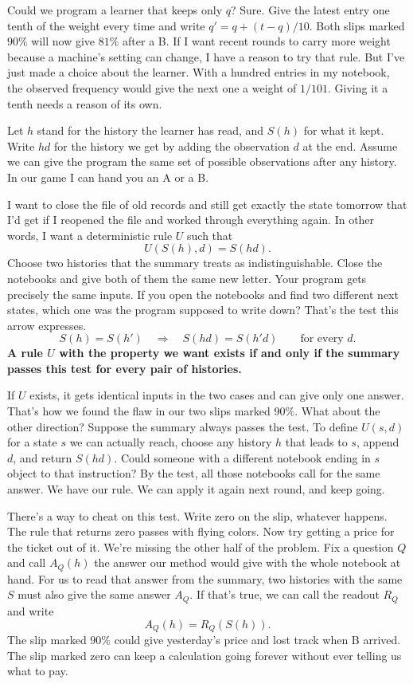 Could we program a learner that keeps only $q$? Sure. Give the latest entry one tenth of the weight every time and write $q'=q+(t-q)/10$. Both slips marked $90\%$ will now give $81\%$ after a B. If I want recent rounds to carry more weight because a machine's setting can change, I have a reason to try that rule. But I've just made a choice about the learner. With a hundred entries in my notebook, the observed frequency would give the next one a weight of $1/101$. Giving it a tenth needs a reason of its own.

Let $h$ stand for the history the learner has read, and $S(h)$ for what it kept. Write $hd$ for the history we get by adding the observation $d$ at the end. Assume we can give the program the same set of possible observations after any history. In our game I can hand you an A or a B.

I want to close the file of old records and still get exactly the state tomorrow that I'd get if I reopened the file and worked through everything again. In other words, I want a deterministic rule $U$ such that
\[
                        U(S(h),d)=S(hd).
\]
Choose two histories that the summary treats as indistinguishable. Close the notebooks and give both of them the same new letter. Your program gets precisely the same inputs. If you open the notebooks and find two different next states, which one was the program supposed to write down? That's the test this arrow expresses.
\[
              S(h)=S(h')\quad\Longrightarrow\quad S(hd)=S(h'd)
              \qquad\text{for every }d .
\]
\textbf{A rule $U$ with the property we want exists if and only if the summary passes this test for every pair of histories.}

If $U$ exists, it gets identical inputs in the two cases and can give only one answer. That's how we found the flaw in our two slips marked $90\%$. What about the other direction? Suppose the summary always passes the test. To define $U(s,d)$ for a state $s$ we can actually reach, choose any history $h$ that leads to $s$, append $d$, and return $S(hd)$. Could someone with a different notebook ending in $s$ object to that instruction? By the test, all those notebooks call for the same answer. We have our rule. We can apply it again next round, and keep going.

There's a way to cheat on this test. Write zero on the slip, whatever happens. The rule that returns zero passes with flying colors. Now try getting a price for the ticket out of it. We're missing the other half of the problem. Fix a question $Q$ and call $A_Q(h)$ the answer our method would give with the whole notebook at hand. For us to read that answer from the summary, two histories with the same $S$ must also give the same answer $A_Q$. If that's true, we can call the readout $R_Q$ and write
\[
                         A_Q(h)=R_Q(S(h)).
\]
The slip marked $90\%$ could give yesterday's price and lost track when B arrived. The slip marked zero can keep a calculation going forever without ever telling us what to pay.

